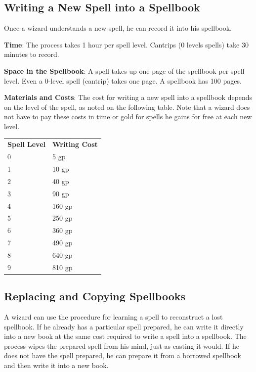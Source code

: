 \subsection{Writing a New Spell into a Spellbook}

				
Once a wizard understands a new spell, he can record it into his spellbook.
				
\textbf{Time}: The process takes 1 hour per spell level. Cantrips (0 levels spells) take 30 minutes to record.
				
\textbf{Space in the Spellbook}: A spell takes up one page of the spellbook per spell level. Even a 0-level spell (cantrip) takes one page. A spellbook has 100 pages.
				
\textbf{Materials and Costs}: The cost for writing a new spell into a spellbook depends on the level of the spell, as noted on the following table. Note that a wizard does not have to pay these costs in time or gold for spells he gains for free at each new level.

\begin{table}
\sffamily
 \begin{tabular}{ll}
\textbf{Spell Level} & \textbf{Writing Cost}\\
0 & 5 gp\\
1 & 10 gp\\
2 & 40 gp\\
3 & 90 gp\\
4 & 160 gp\\
5 & 250 gp\\
6 & 360 gp\\
7 & 490 gp\\
8 & 640 gp\\
9 & 810 gp\\
 \end{tabular}

\end{table}


				
\subsection{Replacing and Copying Spellbooks}

				
A wizard can use the procedure for learning a spell to reconstruct a lost spellbook. If he already has a particular spell prepared, he can write it directly into a new book at the same cost required to write a spell into a spellbook. The process wipes the prepared spell from his mind, just as casting it would. If he does not have the spell prepared, he can prepare it from a borrowed spellbook and then write it into a new book.
				
